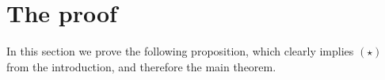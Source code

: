 \documentclass[11pt]{amsart}
\theoremstyle{remark}
\numberwithin{equation}{section}
\begin{document}
%
%
%
%
%




\section{The proof}
\label{pfsec}

 In this section we prove the following proposition, which clearly implies $(\star)$ from the introduction, and therefore the main theorem.
\end{document}
